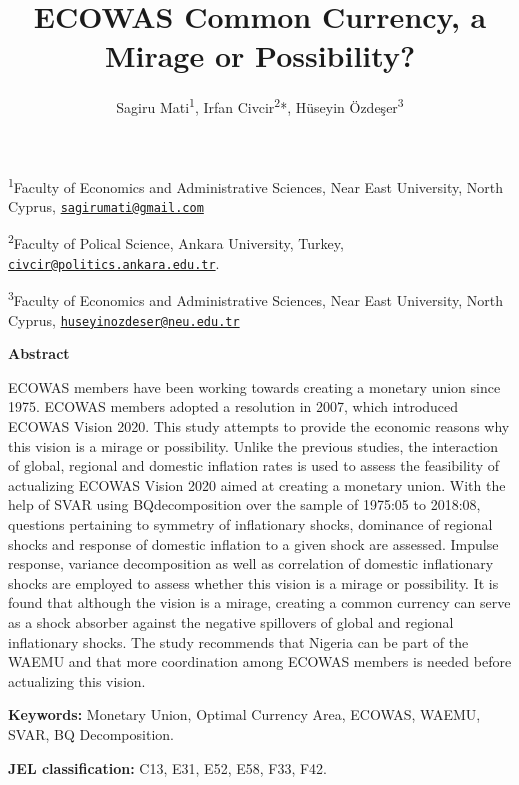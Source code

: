 \documentclass[]{article}
\title{ECOWAS Common Currency, a Mirage or Possibility?}
\author{Sagiru Mati\textsuperscript{1}, Irfan Civcir\textsuperscript{2}*, Hüseyin Özdeşer\textsuperscript{3}}
\date{}
\begin{document}
\maketitle

\thispagestyle{empty}

\textsuperscript{1}Faculty of Economics and Administrative Sciences, Near East University, North Cyprus, \href{mailto:sagirumati@gmail.com}{\nolinkurl{sagirumati@gmail.com}}

\textsuperscript{2}Faculty of Polical Science, Ankara University, Turkey, \href{mailto:civcir@politics.ankara.edu.tr}{\nolinkurl{civcir@politics.ankara.edu.tr}}.

\textsuperscript{3}Faculty of Economics and Administrative Sciences, Near East University, North Cyprus, \href{mailto:huseyinozdeser@neu.edu.tr}{\nolinkurl{huseyinozdeser@neu.edu.tr}}

\centerline{\bf{Abstract}}

 \ac{ECOWAS} members have been working towards creating a monetary union since 1975. \ac{ECOWAS} members adopted a resolution in 2007, which introduced ECOWAS Vision 2020. This study attempts to provide the economic reasons why this vision is a mirage or possibility. Unlike the previous studies, the interaction of global, regional and domestic inflation rates is used to assess the feasibility of actualizing \ac{ECOWAS} Vision 2020 aimed at creating a monetary union. With the help of  \ac{SVAR} using  \ac{BQ}decomposition over the sample of 1975:05 to 2018:08, questions pertaining to symmetry of inflationary shocks, dominance of regional shocks and response of domestic inflation to a given shock are assessed. Impulse response, variance decomposition as well as correlation of domestic inflationary shocks are employed to assess whether this vision is a mirage or possibility. It is found that although the vision is a mirage, creating a common currency can serve as a shock absorber against the negative spillovers of global and regional inflationary shocks. The study recommends that Nigeria can be part of the WAEMU and that more coordination among ECOWAS members is needed before actualizing this vision.

\textbf{Keywords:} Monetary Union, Optimal Currency Area, ECOWAS, WAEMU, SVAR, \ac{BQ} Decomposition.

\textbf{JEL classification:} C13, E31, E52, E58, F33, F42.
\end{document}
